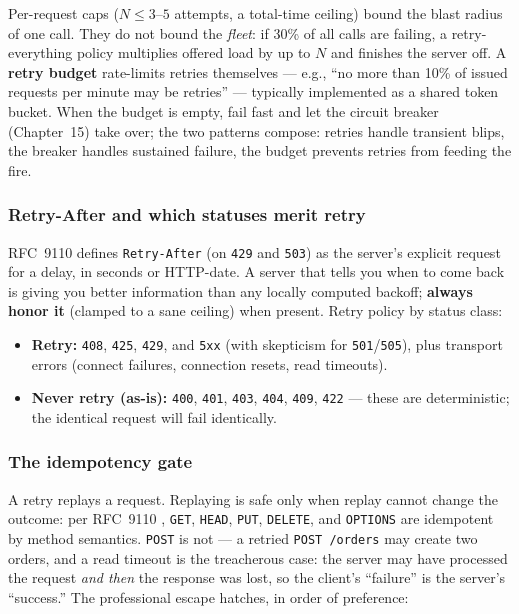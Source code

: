 Per-request caps ($N \le 3$--$5$ attempts, a total-time ceiling) bound the
blast radius of one call. They do not bound the \emph{fleet}: if 30\% of all
calls are failing, a retry-everything policy multiplies offered load by up to
$N$ and finishes the server off. A \textbf{retry budget} rate-limits retries
themselves --- e.g., ``no more than 10\% of issued requests per minute may be
retries'' --- typically implemented as a shared token bucket. When the budget
is empty, fail fast and let the circuit breaker (Chapter~15) take over; the
two patterns compose: retries handle transient blips, the breaker handles
sustained failure, the budget prevents retries from feeding the fire.

\subsubsection{Retry-After and which statuses merit retry}

RFC~9110 \cite{rfc9110} defines \texttt{Retry-After} (on \texttt{429} and
\texttt{503}) as the server's explicit request for a delay, in seconds or
HTTP-date. A server that tells you when to come back is giving you better
information than any locally computed backoff; \textbf{always honor it}
(clamped to a sane ceiling) when present. Retry policy by status class:

\begin{itemize}
  \item \textbf{Retry:} \texttt{408}, \texttt{425}, \texttt{429}, and
        \texttt{5xx} (with skepticism for \texttt{501}/\texttt{505}), plus
        transport errors (connect failures, connection resets, read
        timeouts).
  \item \textbf{Never retry (as-is):} \texttt{400}, \texttt{401},
        \texttt{403}, \texttt{404}, \texttt{409}, \texttt{422} --- these are
        deterministic; the identical request will fail identically.
\end{itemize}

\subsubsection{The idempotency gate}

A retry replays a request. Replaying is safe only when replay cannot change
the outcome: per RFC~9110 \cite{rfc9110}, \texttt{GET}, \texttt{HEAD},
\texttt{PUT}, \texttt{DELETE}, and \texttt{OPTIONS} are idempotent by method
semantics. \texttt{POST} is not --- a retried \texttt{POST /orders} may create
two orders, and a read timeout is the treacherous case: the server may have
processed the request \emph{and then} the response was lost, so the client's
``failure'' is the server's ``success.'' The professional escape hatches, in
order of preference:

